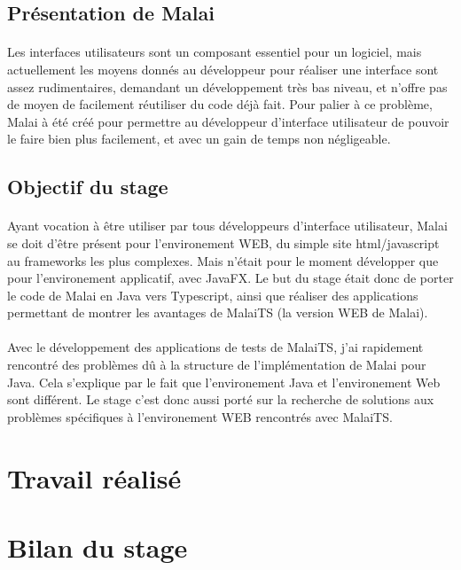 \documentclass[11pt, a4paper, pdftex]{article}
\begin{document}
        \subsection{Présentation de Malai}\label{subsec:premal}
            \paragraph{}
                Les interfaces utilisateurs sont un composant essentiel pour un logiciel, mais actuellement les moyens donnés au développeur pour réaliser
                une interface sont assez rudimentaires, demandant un développement très bas niveau, et n'offre pas de moyen de facilement réutiliser du code déjà fait.
                Pour palier à ce problème, Malai à été créé pour permettre au développeur d'interface utilisateur de pouvoir le faire bien plus facilement, et avec un gain de temps non négligeable.
    \vspace{1cm}
        \subsection{Objectif du stage}\label{subsec:objsta}
            \paragraph{}
                Ayant vocation à être utiliser par tous développeurs d'interface utilisateur, Malai se doit d'être présent pour l'environement WEB, du simple site html/javascript au frameworks les plus complexes.
                Mais n'était pour le moment développer que pour l'environement applicatif, avec JavaFX. Le but du stage était donc de porter le code de Malai en Java
                vers Typescript, ainsi que réaliser des applications permettant de montrer les avantages de MalaiTS (la version WEB de Malai).
            \paragraph{}
                Avec le développement des applications de tests de MalaiTS, j'ai rapidement rencontré des problèmes dû à la structure de l'implémentation de Malai pour Java.
                Cela s'explique par le fait que l'environement Java et l'environement Web sont différent.
                Le stage c'est donc aussi porté sur la recherche de solutions aux problèmes spécifiques à l'environement WEB rencontrés avec MalaiTS\@.
    \newpage
    \section{Travail réalisé}\label{sec:trarea}
        \subsection{}
    \newpage
    \section{Bilan du stage}\label{sec:bilsta}
\end{document}
